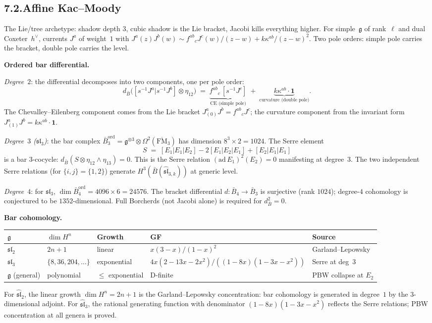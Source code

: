 \documentclass[11pt,reqno]{amsart}
\theoremstyle{definition}
\theoremstyle{remark}
\providecommand{\barB}{\bar{B}}
\providecommand{\fg}{\mathfrak{g}}
\numberwithin{equation}{section}
\begin{document}
\subsection*{7.2.\quad Affine Kac--Moody}

The Lie/tree archetype: shadow depth $3$, cubic shadow is the
Lie bracket, Jacobi kills everything higher. For simple~$\fg$
of rank~$\ell$ and dual Coxeter~$h^\vee$, currents $J^a$ of
weight~$1$ with
$J^a(z)J^b(w)\sim f^{ab}{}_cJ^c(w)/(z{-}w)+k\kappa^{ab}/(z{-}w)^2$.
Two pole orders: simple pole carries the bracket, double pole
carries the level.

\medskip\noindent\textbf{Ordered bar differential.}\enspace

\emph{Degree~$2$}: the differential decomposes into two components,
one per pole order:
\[
d_{\barB}\bigl([s^{-1}J^a|s^{-1}J^b]\otimes\eta_{12}\bigr)
\;=\;
\underbrace{f^{ab}{}_{c}\,[s^{-1}J^c]}_{\text{CE (simple pole)}}
\;+\;
\underbrace{k\kappa^{ab}\cdot\mathbf{1}}_{\text{curvature (double pole)}}.
\]
The Chevalley--Eilenberg component comes from the Lie bracket
$J^a_{(0)}J^b=f^{ab}{}_cJ^c$; the curvature component from the
invariant form $J^a_{(1)}J^b=k\kappa^{ab}\cdot\mathbf{1}$.

\emph{Degree~$3$ ($\mathfrak{sl}_3$)}: the bar complex
$\barB^{\mathrm{ord}}_3=\fg^{\otimes 3}
\otimes\Omega^2(\overline{\mathrm{FM}}_3)$ has dimension
$8^3\times 2=1024$. The Serre element
\[
S\;=\;[E_1|E_1|E_2]-2[E_1|E_2|E_1]+[E_2|E_1|E_1]
\]
is a bar $3$-cocycle: $d_{\barB}(S\otimes\eta_{12}\wedge\eta_{13})=0$.
This is the Serre relation $(\mathrm{ad}\,E_1)^2(E_2)=0$
manifesting at degree~$3$. The two independent Serre
relations (for $\{i,j\}=\{1,2\}$) generate
$H^3(\barB(\widehat{\mathfrak{sl}}_{3,k}))$ at generic level.

\emph{Degree~$4$}: for $\mathfrak{sl}_3$,
$\dim\barB^{\mathrm{ord}}_4=4096\times 6=24576$.
The bracket differential $d\colon\barB_4\to\barB_3$ is surjective
(rank $1024$); degree-$4$ cohomology is conjectured to be
$1352$-dimensional. Full Borcherds (not Jacobi alone) is required
for $d_{\barB}^2=0$.

\medskip\noindent\textbf{Bar cohomology.}\enspace
\begin{center}
\small
\renewcommand{\arraystretch}{1.15}
\begin{tabular}{lllll}
$\fg$ & $\dim H^n$ & Growth & GF & Source\\ \hline
$\mathfrak{sl}_2$ & $2n+1$ & linear & $x(3{-}x)/(1{-}x)^{2}$
 & Garland--Lepowsky\\
$\mathfrak{sl}_3$ & $\{8,36,204,\ldots\}$ & exponential
 & $4x(2{-}13x{-}2x^2)/((1{-}8x)(1{-}3x{-}x^2))$ & Serre at deg~$3$\\
$\fg$ (general) & polynomial & $\le$ exponential & D-finite
 & PBW collapse at $E_2$
\end{tabular}
\end{center}
For $\widehat{\mathfrak{sl}}_2$, the linear growth $\dim H^n=2n+1$
is the Garland--Lepowsky concentration: bar cohomology is generated
in degree~$1$ by the $3$-dimensional adjoint. For
$\widehat{\mathfrak{sl}}_3$, the rational generating function with
denominator $(1-8x)(1-3x-x^2)$ reflects the Serre relations; PBW
concentration at all genera is proved.
\end{document}
